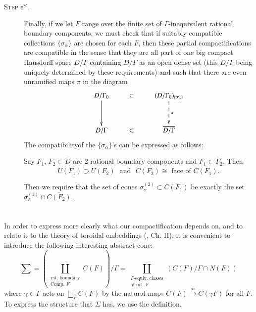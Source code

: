 \begin{description}
\pageoriginale
\item[\textsc{Step} e$''$.] Finally, if we let $F$ range over the finite set of $\Gamma$-inequivalent rational boundary components, we must check that if suitably compatible collections $\{\sigma_\alpha\}$ are chosen for each $F$, then these partial compactifications are compatible in the sense that they are all part of one big compact Hausdorff space $D/\Gamma$ containing $\overline{D/\Gamma}$ as an open dense set (this $D/ \Gamma$ being uniquely determined by these requirements) and such that there are even unramified maps $\pi$ in the diagram
$$
\xymatrix@R=1.2cm{
D/\Gamma_0 \ar[d]& \subset & (D/\Gamma_0)_{\{\sigma_\alpha\}} \ar@{-->}[d]^\pi\\
D/\Gamma & \subset & \overline{D/ \Gamma}
}
$$
The compatibility\pageoriginale of the $\{\sigma_\alpha\}$'s can be expressed as follows:

Say $F_1$, $F_2 \subset \overline{D}$ are 2 rational boundary components and $F_1 \subset \bar{F}_2$. Then
$$
U(F_1) \supset U (F_2) \text{~ and ~} C (F_2) \cong \text{ face of } \overline{C(F_1)}.
$$

Then we require that the set of cones $\sigma_\alpha^{(2)} \subset \overline{C(F_1)}$ be exactly the set $\sigma^{(1)}_\alpha \cap \overline{C(F_2)}$.
\end{description}

\section{}\label{art8-sec4}
In order to express more clearly what our compactification depends on, and to relate it to the theory of toroidal embeddings  (\cite{art8-key8}, Ch. II), it is convenient to introduce the following interesting abstract cone:
$$
\sum =  \left(\coprod\limits_{\substack{\text{rat. boundary}\\\text{Comp. $F$}}} C (F) \right) / \Gamma = \coprod\limits_{\substack{\text{$\Gamma$-equiv. classes}\\\text{of rat. $F$}}} (C (F) / \Gamma \cap N (F) )
$$
where $\gamma \in \Gamma$ acts on $\bigsqcup\limits_F C (F)$ by the natural maps $C(F) \xrightarrow{\approx} C(\gamma F)$ for all $F$. To express the structure that $\Sigma$ has, we use the definition.

